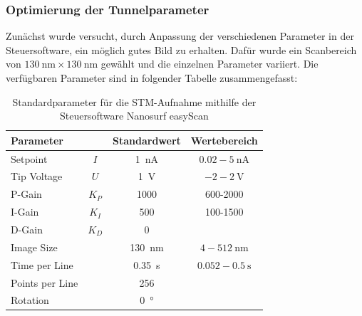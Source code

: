 \documentclass[a4paper,twoside,final]{article}
\begin{document}
\subsubsection{Optimierung der Tunnelparameter}
Zunächst wurde versucht, durch Anpassung der verschiedenen Parameter in der Steuersoftware, ein möglich gutes Bild zu erhalten. Dafür wurde ein Scanbereich von $\SI{130}{\nano\metre} \times \SI{130}{\nano\metre}$ gewählt und die einzelnen Parameter variiert.
Die verfügbaren Parameter sind in folgender Tabelle zusammengefasst:
\begin{table}[ht]
	\centering
	\caption{Standardparameter für die STM-Aufnahme mithilfe der Steuersoftware Nanosurf easyScan}
	\label{tab:Parameter}
  \begin{tabular}{l c c c}
   \toprule
   Parameter   &       & Standardwert          & Wertebereich\\
   \midrule
   Setpoint    & $I$   & \SI{1}{\nano\ampere}  & $0.02-\SI{5}{\nano\ampere}$\\
   Tip Voltage & $U$   & \SI{1}{\volt}         & $-2 - \SI{2}{\volt}$\\
   P-Gain      & $K_P$ & 1000                  & 600-2000\\
   I-Gain      & $K_I$ & 500                   & 100-1500\\
   D-Gain      & $K_D$ & 0                     & \\
   Image Size  &       & \SI{130}{\nano\metre} & $4-\SI{512}{\nano\metre}$\\
   Time per Line &     & \SI{0.35}{\second}    & $0.052 - \SI{0.5}{\second}$\\
   Points per Line &   & 256                   &\\
   Rotation    &       & \SI{0}{\degree}       &\\ \bottomrule
  \end{tabular}
\end{table}
\end{document}
